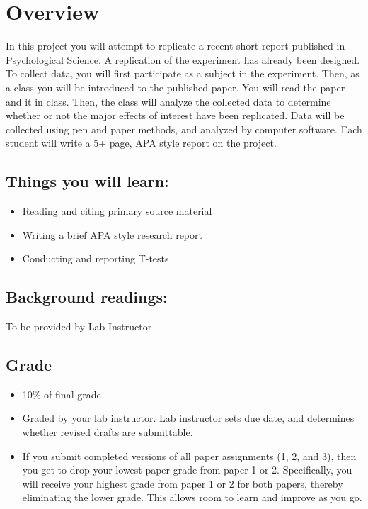 

\section{Overview}

In this project you will attempt to replicate a recent short report published in Psychological Science. A replication of the experiment has already been designed. To collect data, you will first participate as a subject in the experiment. Then, as a class you will be introduced to the published paper. You will read the paper and it in class. Then, the class will analyze the collected data to determine whether or not the major effects of interest have been replicated. Data will be collected using pen and paper methods, and analyzed by computer software. Each student will write a 5+ page, APA style report on the project.

\subsection{Things you will learn:}

\begin{itemize}
\item Reading and citing primary source material
\item Writing a brief APA style research report
\item Conducting and reporting T-tests
\end{itemize}

\subsection{Background readings:}

To be provided by Lab Instructor

\subsection{Grade}
\begin{itemize}
\item  10\% of final grade
\item Graded by your lab instructor. Lab instructor sets due date, and determines whether revised drafts are submittable.
\item If you submit completed versions of all paper assignments (1, 2, and 3), then you get to drop your lowest paper grade from paper 1 or 2. Specifically, you will receive your highest grade from paper 1 or 2 for both papers, thereby eliminating the lower grade. This allows room to learn and improve as you go. 
\end{itemize}


